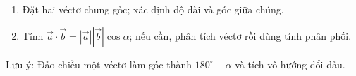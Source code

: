 \begin{enumerate}
\item Đặt hai véctơ chung gốc; xác định độ dài và góc giữa chúng.
\item Tính $\overrightarrow{a}\cdot\overrightarrow{b}=|\overrightarrow{a}||\overrightarrow{b}|\cos\alpha$; nếu cần, phân tích véctơ rồi dùng tính phân phối.
\end{enumerate}
Lưu ý: Đảo chiều một véctơ làm góc thành $180^\circ-\alpha$ và tích vô hướng đổi dấu.
